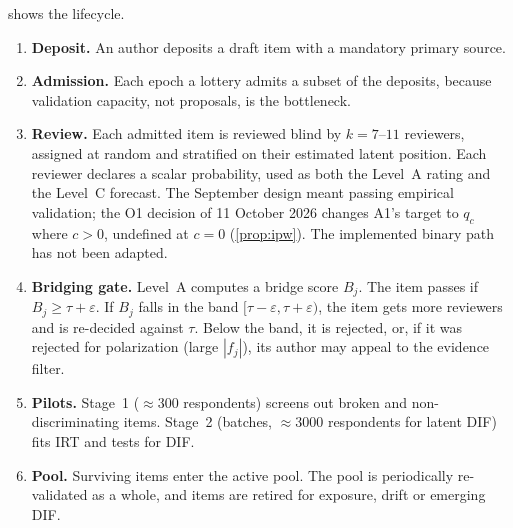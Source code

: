  shows the lifecycle.
\begin{enumerate}
  \item \textbf{Deposit.} An author deposits a draft item with a mandatory primary source.
  \item \textbf{Admission.} Each epoch a lottery admits a subset of the deposits, because
    validation capacity, not proposals, is the bottleneck.
  \item \textbf{Review.} Each admitted item is reviewed blind by $k=7$--$11$ reviewers,
    assigned at random and stratified on their estimated latent position. Each reviewer
    declares a scalar probability, used as both the Level~A rating and the Level~C forecast.
    The September design meant passing empirical validation; the O1 decision of 11 October
    2026 changes A1's target to $q_c$ where $c>0$, undefined at $c=0$
    (\cref{prop:ipw}). The implemented binary path has not been adapted.
  \item \textbf{Bridging gate.} Level~A computes a bridge score $B_j$. The item passes if
    $B_j\ge\tau+\varepsilon$. If $B_j$ falls in the band $[\tau-\varepsilon,\tau+\varepsilon)$,
    the item gets more reviewers and is re-decided against $\tau$. Below the band, it is
    rejected, or, if it was rejected for polarization (large $|f_j|$), its author may appeal
    to the evidence filter.
  \item \textbf{Pilots.} Stage~1 ($\approx300$ respondents) screens out broken and
    non-discriminating items. Stage~2 (batches, $\approx3000$ respondents for latent DIF)
    fits IRT and tests for DIF.
  \item \textbf{Pool.} Surviving items enter the active pool. The pool is periodically
    re-validated as a whole, and items are retired for exposure, drift or emerging DIF.
\end{enumerate}


